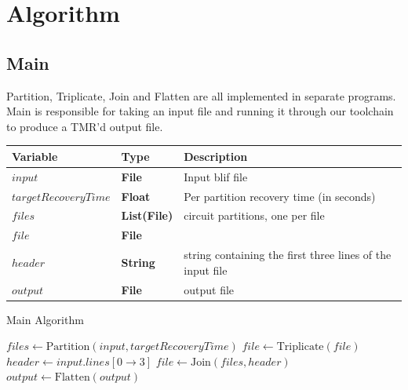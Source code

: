 \documentclass[12pt,final,oneside]{dwThesis} %
\begin{document}
   \newpage 
   \section{Algorithm}
   \label{secAlgorithm} 
   \subsection{Main}

   Partition, Triplicate, Join and Flatten are all implemented in separate
   programs. Main is responsible for taking an input file and running it
   through our toolchain to produce a TMR'd output file.



   \begin{algorithm}

      \begin{center}

         \begin{tabular}
            {lll} \toprule Variable &
            Type & Description\\
            \midrule $input$ & \textbf{File} &  Input blif
            file\\
            $targetRecoveryTime$ & \textbf{ Float} &  Per partition
            recovery time (in seconds) \\
            $files$ & \textbf{List(File)} &
            circuit partitions, one per file \\
            $file$ & \textbf{File} &  \\

            $header$ & \textbf{ String} &  string containing the first three
            lines of the input file \\
            $output$ & \textbf{File} &  output
            file\\
            \bottomrule 
         \end{tabular}

      \end{center}
      \caption{Main
         Algorithm}\label{main} 
      \begin{algorithmic}
         [1]
         \State $files \gets
         \mbox{Partition}(input, targetRecoveryTime)$  
         \State $file \gets \mbox{Triplicate}(file)$ \EndFor 
         \State
         $header \gets input.lines[0\to 3]$ 
         \State $file \gets
         \mbox{Join}(files, header)$ 
         \State $output \gets
         \mbox{Flatten}(output)$ \EndProcedure 
      \end{algorithmic}


   \end{algorithm}
\end{document}
